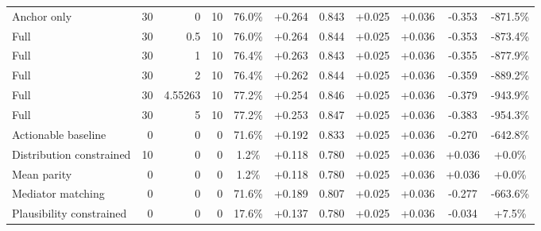 \begin{table}[htbp]
\begin{tabular}{lrrrccccccc}
Anchor only & 30 & 0 & 10 & 76.0\% & +0.264 & 0.843 & +0.025 & +0.036 & -0.353 & -871.5\% \\
Full & 30 & 0.5 & 10 & 76.0\% & +0.264 & 0.844 & +0.025 & +0.036 & -0.353 & -873.4\% \\
Full & 30 & 1 & 10 & 76.4\% & +0.263 & 0.843 & +0.025 & +0.036 & -0.355 & -877.9\% \\
Full & 30 & 2 & 10 & 76.4\% & +0.262 & 0.844 & +0.025 & +0.036 & -0.359 & -889.2\% \\
Full & 30 & 4.55263 & 10 & 77.2\% & +0.254 & 0.846 & +0.025 & +0.036 & -0.379 & -943.9\% \\
Full & 30 & 5 & 10 & 77.2\% & +0.253 & 0.847 & +0.025 & +0.036 & -0.383 & -954.3\% \\
Actionable baseline & 0 & 0 & 0 & 71.6\% & +0.192 & 0.833 & +0.025 & +0.036 & -0.270 & -642.8\% \\
Distribution constrained & 10 & 0 & 0 & 1.2\% & +0.118 & 0.780 & +0.025 & +0.036 & +0.036 & +0.0\% \\
Mean parity & 0 & 0 & 0 & 1.2\% & +0.118 & 0.780 & +0.025 & +0.036 & +0.036 & +0.0\% \\
Mediator matching & 0 & 0 & 0 & 71.6\% & +0.189 & 0.807 & +0.025 & +0.036 & -0.277 & -663.6\% \\
Plausibility constrained & 0 & 0 & 0 & 17.6\% & +0.137 & 0.780 & +0.025 & +0.036 & -0.034 & +7.5\% \\
\bottomrule
\end{tabular}
\end{table}